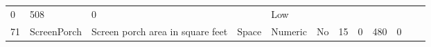 \documentclass[11pt]{article}
\begin{document}
\begin{longtable}[]{@{}llllllllllll@{}}
\begin{minipage}[t]{0.04\columnwidth}
0\strut
\end{minipage} & \begin{minipage}[t]{0.04\columnwidth}\raggedright\strut
508\strut
\end{minipage} & \begin{minipage}[t]{0.04\columnwidth}\raggedright\strut
0\strut
\end{minipage} & \begin{minipage}[t]{0.04\columnwidth}\raggedright\strut
\strut
\end{minipage} & \begin{minipage}[t]{0.04\columnwidth}\raggedright\strut
Low\strut
\end{minipage}\tabularnewline
\begin{minipage}[t]{0.04\columnwidth}\raggedright\strut
71\strut
\end{minipage} & \begin{minipage}[t]{0.04\columnwidth}\raggedright\strut
ScreenPorch\strut
\end{minipage} & \begin{minipage}[t]{0.04\columnwidth}\raggedright\strut
Screen porch area in square feet\strut
\end{minipage} & \begin{minipage}[t]{0.04\columnwidth}\raggedright\strut
Space\strut
\end{minipage} & \begin{minipage}[t]{0.04\columnwidth}\raggedright\strut
Numeric\strut
\end{minipage} & \begin{minipage}[t]{0.04\columnwidth}\raggedright\strut
No\strut
\end{minipage} & \begin{minipage}[t]{0.04\columnwidth}\raggedright\strut
15\strut
\end{minipage} & \begin{minipage}[t]{0.04\columnwidth}\raggedright\strut
0\strut
\end{minipage} & \begin{minipage}[t]{0.04\columnwidth}\raggedright\strut
480\strut
\end{minipage} & \begin{minipage}[t]{0.04\columnwidth}\raggedright\strut
0\strut
\end{minipage} & \begin{minipage}[t]{0.04\columnwidth}\raggedright\strut
\strut
\end{minipage} & \begin{minipage}[t]{0.04\columnwidth}\raggedright\strut

\end{minipage}
\end{longtable}
\end{document}
